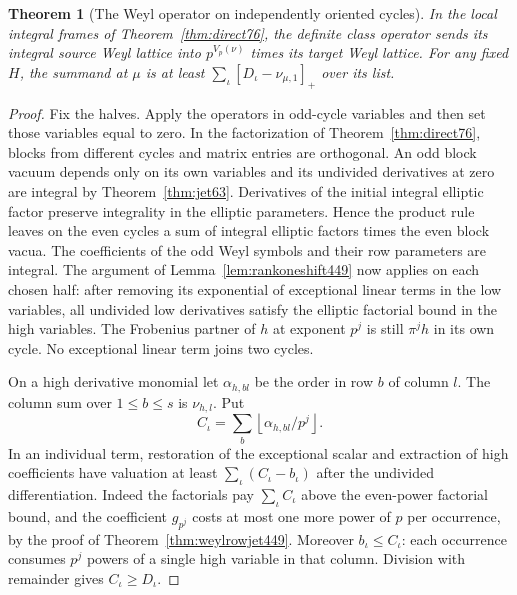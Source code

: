 \documentclass[a4paper,11pt]{article}
\newtheorem{theorem}[proposition]{Theorem}
\theoremstyle{definition}
\theoremstyle{remark}
\numberwithin{equation}{section}
\begin{document}
\begin{theorem}[The Weyl operator on independently oriented cycles]\leavevmode
\label{thm:cycleweyl461}
In the local integral frames of Theorem~\ref{thm:direct76},
the definite class operator sends its integral source Weyl
lattice into \(p^{V_p(\nu)}\) times its target Weyl lattice.
For any fixed \(H\), the summand at \(\mu\) is at least
\(\sum_\iota[D_\iota-\nu_{\mu,1}]_+\) over its list.
\end{theorem}
\begin{proof}
Fix the halves. Apply the operators in odd-cycle variables and
then set those variables equal to zero. In the factorization of
Theorem~\ref{thm:direct76}, blocks from different cycles and
matrix entries are orthogonal. An odd block vacuum depends only
on its own variables and its undivided derivatives at zero are
integral by Theorem~\ref{thm:jet63}. Derivatives of the initial
integral elliptic factor preserve integrality in the elliptic
parameters. Hence the product rule leaves on the even cycles
a sum of integral elliptic factors times the even block vacua.
The coefficients of the odd Weyl symbols and their row
parameters are integral. The argument of
Lemma~\ref{lem:rankoneshift449} now applies on each chosen
half: after removing its exponential of exceptional linear
terms in the low variables, all undivided low derivatives
satisfy the elliptic factorial bound in the high variables.
The Frobenius partner of \(h\) at exponent \(p^j\) is still
\(\pi^jh\) in its own cycle. No exceptional linear term joins
two cycles.

On a high derivative monomial let \(\alpha_{h,bl}\) be the
order in row \(b\) of column \(l\). The column sum over
\(1\le b\le s\) is \(\nu_{h,l}\). Put
\[
           C_\iota=\sum_b\left\lfloor
                              \alpha_{h,bl}/p^j\right\rfloor .
\]
In an individual term, restoration of the exceptional scalar
and extraction of high coefficients have valuation at least
\(\sum_\iota (C_\iota-b_\iota)\) after the undivided
differentiation. Indeed the factorials pay
\(\sum_\iota C_\iota\) above the even-power factorial bound,
and the coefficient \(g_{p^j}\) costs at most one more power
of \(p\) per occurrence, by the proof of
Theorem~\ref{thm:weylrowjet449}. Moreover \(b_\iota\le C_\iota\):
each occurrence consumes \(p^j\) powers of a single high
variable in that column. Division with remainder gives
\(C_\iota\ge D_\iota\).


\end{proof}
\end{document}
